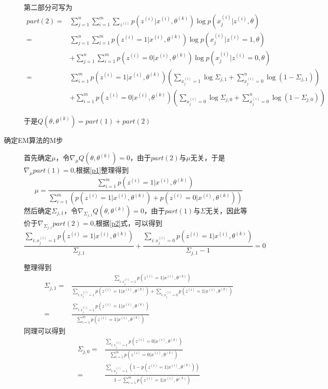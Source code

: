 \documentclass[a4paper,oneside,12pt]{article}
\begin{document}
\begin{spacing}{1.5}
\begin{description}
      第二部分可写为
      \begin{align}\label{p2}
        part(2) = & \sum_{j=1}^{n} \sum_{i=1}^{m} \sum_{z^{(i)}} p(z^{(i)}|x^{(i)},\theta ^{(k)}) \log p(x^{(i)}_j|z^{(i)},\theta) \\
        = & \sum_{j=1}^{n} \sum_{i=1}^{m}  p(z^{(i)}=1|x^{(i)},\theta ^{(k)}) \log p(x^{(i)}_j|z^{(i)}=1,\theta) \\
          & + \sum_{j=1}^{n} \sum_{i=1}^{m}  p(z^{(i)}=0|x^{(i)},\theta ^{(k)}) \log p(x^{(i)}_j|z^{(i)}=0,\theta)\\
        = & \sum_{i=1}^{m} p(z^{(i)}=1|x^{(i)},\theta ^{(k)}) \left(\sum_{x^{(i)}_j=1} \log \Sigma_{j,1}+\sum_{x^{(i)}_j=0}^{n}  \log (1-\Sigma_{j,1}) \right)\\
        & + \sum_{i=1}^{m} p(z^{(i)}=0|x^{(i)},\theta ^{(k)}) \left(\sum_{x^{(i)}_j=0} \log \Sigma_{j,0}+\sum_{x^{(i)}_j=0}^{n}  \log (1-\Sigma_{j,0}) \right)
      \end{align}

      于是$Q(\theta,\theta^{(k)})= part(1)+part(2)$

  \item[确定EM算法的M步]
  首先确定$\mu$，令$\nabla_{\mu} Q(\theta,\theta^{(k)})=0$，由于$part(2)$与$\mu$无关，于是$\nabla_{\mu}part(1)=0$,根据\ref{p1}整理得到
  \begin{equation}\label{mu}
    \mu= \frac{\sum\limits_{i=1}^{m} p(z^{(i)}=1|x^{(i)},\theta ^{(k)})}
    {\sum\limits_{i=1}^{m}\left(p(z^{(i)}=1|x^{(i)},\theta ^{(k)})+p(z^{(i)}=0|x^{(i)},\theta ^{(k)})\right)}
  \end{equation}
  然后确定$\Sigma_{j,1}$，令$\nabla_{\Sigma_{j,1}}Q(\theta,\theta^{(k)})=0$，由于$part(1)$与$\Sigma$无关，因此等价于$\nabla_{\Sigma_{j,1}}part(2)=0$,根据\ref{p2}式，可以得到
  \[ \frac{\sum\limits_{i:x^{(i)}_j=1}p(z^{(i)}=1|x^{(i)},\theta ^{(k)})}{\Sigma_{j,1}} + \frac{\sum\limits_{i:x^{(i)}_j=0} p(z^{(i)}=1|x^{(i)},\theta ^{(k)})}{\Sigma_{j,1}-1}=0\]

  整理得到
  \begin{align}\label{j1}
    \Sigma_{j,1}= & \frac{\sum\limits_{i:x^{(i)}_j=1}p(z^{(i)}=1|x^{(i)},\theta ^{(k)})}{\sum\limits_{i:x^{(i)}_j=1}p(z^{(i)}=1|x^{(i)},\theta ^{(k)})+\sum\limits_{i:x^{(i)}_j=0} p(z^{(i)}=1|x^{(i)},\theta ^{(k)})} \\
    =& \frac{\sum\limits_{i:x^{(i)}_j=1}p(z^{(i)}=1|x^{(i)},\theta ^{(k)})}{\sum\limits_{i=1}^{m} p(z^{(i)}=1|x^{(i)},\theta ^{(k)})}
  \end{align}
  同理可以得到
  \begin{align}\label{j0}
    \Sigma_{j,0}= & \frac{\sum\limits_{i:x^{(i)}_j=1}p(z^{(i)}=0|x^{(i)},\theta ^{(k)})}{\sum\limits_{i=1}^{m} p(z^{(i)}=0|x^{(i)},\theta ^{(k)})} \\
    = & \frac{\sum\limits_{i:x^{(i)}_j=1}\left(1-p(z^{(i)}=1|x^{(i)},\theta ^{(k)})\right)}{1-\sum\limits_{i=1}^{m} p(z^{(i)}=1|x^{(i)},\theta ^{(k)})}
  \end{align}
\end{description}

\end{spacing}
\end{document}
